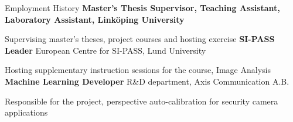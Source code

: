 \begin{rubric}{Employment History}
%
    	\textbf{Master's Thesis Supervisor, Teaching Assistant, Laboratory Assistant, Linköping University}
\par Supervising master's theses, project courses and hosting exercise
%
    	\textbf{SI-PASS Leader} European Centre for SI-PASS, Lund University
     \par Hosting supplementary instruction sessions for the course, Image Analysis
%
	\textbf{Machine Learning Developer} R\&D department, Axis Communication A.B.
 \par Responsible for the project, perspective auto-calibration for security camera applications
%
%

%
\end{rubric}